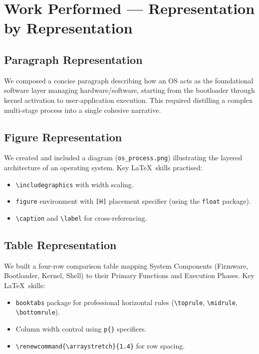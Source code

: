 \documentclass[11pt, a4paper]{article}
\begin{document}
\section{Work Performed --- Representation by Representation}

\subsection{Paragraph Representation}
We composed a concise paragraph describing how an OS acts as the foundational software layer managing hardware/software, starting from the bootloader through kernel activation to user-application execution. This required distilling a complex multi-stage process into a single cohesive narrative.

\subsection{Figure Representation}
We created and included a diagram (\texttt{os\_process.png}) illustrating the layered architecture of an operating system. Key \LaTeX\ skills practised:
\begin{itemize}[nosep]
    \item \texttt{\textbackslash includegraphics} with width scaling.
    \item \texttt{figure} environment with \texttt{[H]} placement specifier (using the \texttt{float} package).
    \item \texttt{\textbackslash caption} and \texttt{\textbackslash label} for cross-referencing.
\end{itemize}

\subsection{Table Representation}
We built a four-row comparison table mapping System Components (Firmware, Bootloader, Kernel, Shell) to their Primary Functions and Execution Phases. Key \LaTeX\ skills:
\begin{itemize}[nosep]
    \item \texttt{booktabs} package for professional horizontal rules (\texttt{\textbackslash toprule}, \texttt{\textbackslash midrule}, \texttt{\textbackslash bottomrule}).
    \item Column width control using \texttt{p\{\}} specifiers.
    \item \texttt{\textbackslash renewcommand\{\textbackslash arraystretch\}\{1.4\}} for row spacing.
\end{itemize}
\end{document}
